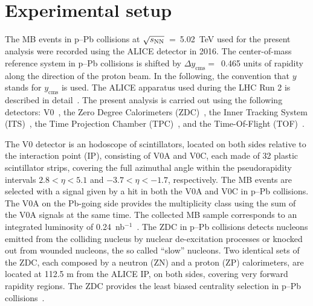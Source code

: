\section{Experimental setup}
\label{sec:setup}
The MB events in p--Pb collisions at $\sqrt{s_{\rm NN}}$~=~5.02~TeV used for the present analysis were recorded using the ALICE detector in 2016. The center-of-mass reference system in p--Pb collisions is shifted by $\Delta y_{\mathrm{cms}} =$~0.465 units of rapidity along the direction of the proton beam. In the following, the convention that $y$ stands for $y_{\mathrm{cms}}$ is used. The ALICE apparatus used during the LHC Run 2 is described in detail~\cite{Abelev:2014ffa}. The present analysis is carried out using the following detectors: V0~\cite{ALICE:2013axi}, the Zero Degree Calorimeters (ZDC)~\cite{Cortese:2019nnv}, the Inner Tracking System (ITS)~\cite{ALICE:2010tia}, the Time Projection Chamber (TPC)~\cite{Alme:2010ke}, and the Time-Of-Flight (TOF)~\cite{Jacazio:2018slq}. 

The V0 detector is an hodoscope of scintillators, located on both sides relative to the interaction point (IP), consisting of V0A and V0C, each made of 32 plastic scintillator strips, covering the full azimuthal angle within the pseudorapidity intervals $2.8 < \eta < 5.1$ and $-3.7 < \eta < -1.7$, respectively. The MB events are selected with a signal given by a hit in both the V0A and V0C in p--Pb collisions. The V0A on the Pb-going side provides the multiplicity class using the sum of the V0A signals at the same time. The collected MB sample corresponds to an integrated luminosity of 0.24~nb$^{-1}$~\cite{ALICE:2014gvw}. The ZDC in p--Pb collisions detects nucleons emitted from the colliding nucleus by nuclear de-excitation processes or knocked out from wounded nucleons, the so called “slow” nucleons. Two identical sets of the ZDC, each composed by a neutron (ZN) and a proton (ZP) calorimeters, are located at 112.5 m from the ALICE IP, on both sides, covering very forward rapidity regions. The ZDC provides the least biased centrality selection in p--Pb collisions~\cite{ALICE:2014xsp}.



